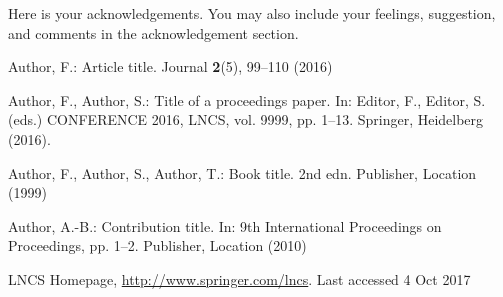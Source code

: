 \documentclass{llncs}
\begin{document}
	Here is your acknowledgements. You may also include your feelings, suggestion, and comments in the acknowledgement section.
	
	\begin{thebibliography}{8}
		Author, F.: Article title. Journal \textbf{2}(5), 99--110 (2016)
		
		Author, F., Author, S.: Title of a proceedings paper. In: Editor,
		F., Editor, S. (eds.) CONFERENCE 2016, LNCS, vol. 9999, pp. 1--13.
		Springer, Heidelberg (2016).
		
		Author, F., Author, S., Author, T.: Book title. 2nd edn. Publisher,
		Location (1999)
		
		Author, A.-B.: Contribution title. In: 9th International Proceedings
		on Proceedings, pp. 1--2. Publisher, Location (2010)
		
		LNCS Homepage, \url{http://www.springer.com/lncs}. Last accessed 4
		Oct 2017
	\end{thebibliography}
\end{document}

